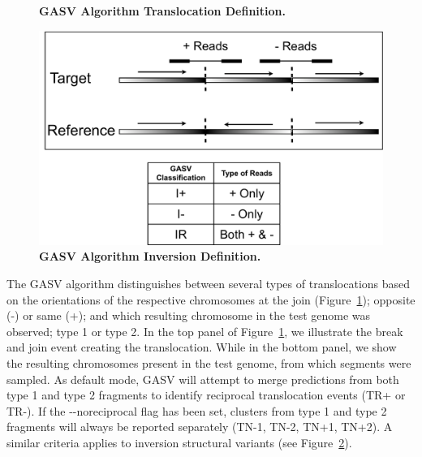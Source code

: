 \documentclass[11pt]{article}
\begin{document}
\begin{figure}[htbp]
   \centering
   \caption{\textbf{GASV Algorithm Translocation Definition.}}
   \label{fig:translocation}
\end{figure}

 \begin{figure}
    \includegraphics[width = 0.45 \textwidth] {Figures/Inversion.pdf} %
   \caption{\textbf{GASV Algorithm Inversion Definition.}}
   \label{fig:inversion}
\end{figure}

The GASV algorithm distinguishes between several types of translocations based on the orientations of the respective chromosomes at the join (Figure~\ref{fig:translocation}); opposite (-) or same (+); and which resulting chromosome in the test genome was observed; type 1 or type 2.  In the top panel of Figure~\ref{fig:translocation}, we illustrate the break and join event creating the translocation. While in the bottom panel, we show the resulting chromosomes present in the test genome, from which segments were sampled. As default mode, GASV will attempt to merge predictions from both type 1 and type 2 fragments to identify reciprocal translocation events (TR+ or TR-). If the -{}-noreciprocal flag has been set, clusters from type 1 and type 2 fragments will always be reported separately (TN-1, TN-2, TN+1, TN+2). A similar criteria applies to inversion structural variants (see Figure~\ref{fig:inversion}).
\end{document}

